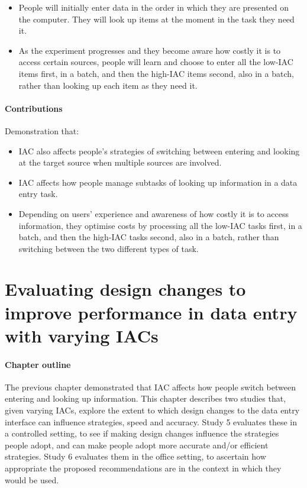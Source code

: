 \documentclass[11pt,oneside]{report}
\begin{document}
\begin{table}
\begin{itemize}
\item 
People will initially enter data in the order in which they are presented on the computer. They will look up items at the moment in the task they need it.
\item 
As the experiment progresses and they become aware how costly it is to access certain sources, people will learn and choose to enter all the low-IAC items first, in a batch, and then the high-IAC items second, also in a batch, rather than looking up each item as they need it. 
 
\end{itemize}

\subsubsection{Contributions}
Demonstration that:
\begin{itemize}

\item   
IAC also affects people's strategies of switching between entering and looking at the target source when multiple sources are involved.
\item
IAC affects how people manage subtasks of looking up information in a data entry task.
\item
Depending on users' experience and awareness of how costly it is to access information, they optimise costs by processing all the low-IAC tasks first, in a batch, and then the high-IAC tasks second, also in a batch, rather than switching between the two different types of task.  
\end{itemize}

\chapter{Evaluating design changes to improve performance in data entry with varying IACs}

\begin{mynote}
\subsubsection{Chapter outline}
The previous chapter demonstrated that IAC affects how people switch between entering and looking up information. This chapter describes two studies that, given varying IACs, explore the extent to which design changes to the data entry interface can influence strategies, speed and accuracy. Study 5 evaluates these in a controlled setting, to see if making design changes influence the strategies people adopt, and can make people adopt more accurate and/or efficient strategies. Study 6 evaluates them in the office setting, to ascertain how appropriate the proposed recommendations are in the context in which they would be used.


\end{mynote}
\end{table}
\end{document}
